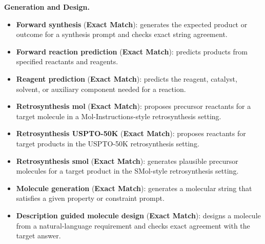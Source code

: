 \begin{appendices}
\textbf{Generation and Design.}
\begin{itemize}
    \item \textbf{Forward synthesis} (\textbf{Exact Match}): generates the expected product or outcome for a synthesis prompt and checks exact string agreement.
    \item \textbf{Forward reaction prediction} (\textbf{Exact Match}): predicts products from specified reactants and reagents.
    \item \textbf{Reagent prediction} (\textbf{Exact Match}): predicts the reagent, catalyst, solvent, or auxiliary component needed for a reaction.
    \item \textbf{Retrosynthesis mol} (\textbf{Exact Match}): proposes precursor reactants for a target molecule in a Mol-Instructions-style retrosynthesis setting.
    \item \textbf{Retrosynthesis USPTO-50K} (\textbf{Exact Match}): proposes reactants for target products in the USPTO-50K retrosynthesis setting.
    \item \textbf{Retrosynthesis smol} (\textbf{Exact Match}): generates plausible precursor molecules for a target product in the SMol-style retrosynthesis setting.
    \item \textbf{Molecule generation} (\textbf{Exact Match}): generates a molecular string that satisfies a given property or constraint prompt.
    \item \textbf{Description guided molecule design} (\textbf{Exact Match}): designs a molecule from a natural-language requirement and checks exact agreement with the target answer.
\end{itemize}


\end{appendices}
